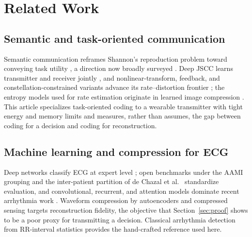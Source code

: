 \documentclass[journal]{IEEEtran}
\begin{document}
\section{Related Work}
\subsection{Semantic and task-oriented communication}
Semantic communication reframes Shannon's reproduction problem \cite{shannon1948} toward conveying task utility \cite{strinati2021,gunduz2023}, a direction now broadly surveyed \cite{qin2022,yang2023,luo2022,getu2024}. Deep JSCC learns transmitter and receiver jointly \cite{bourtsoulatze2019,xie2021,weng2021}, and nonlinear-transform, feedback, and constellation-constrained variants advance its rate--distortion frontier \cite{dai2022,kurka2020,tung2022}; the entropy models used for rate estimation originate in learned image compression \cite{balle2017,balle2018}. This article specializes task-oriented coding to a wearable transmitter with tight energy and memory limits and measures, rather than assumes, the gap between coding for a decision and coding for reconstruction.

\subsection{Machine learning and compression for ECG}
Deep networks classify ECG at expert level \cite{hannun2019,ribeiro2020}; open benchmarks \cite{moody2001,goldberger2000,strodthoff2021,wagner2020} under the AAMI grouping \cite{aami2012} and the inter-patient partition of de Chazal et al.\ \cite{dechazal2004} standardize evaluation, and convolutional, recurrent, and attention models dominate recent arrhythmia work \cite{acharya2017,kachuee2018,mousavi2019,yildirim2018,xia2023,essa2021}. Waveform compression by autoencoders and compressed sensing \cite{yildirim2018c,mamaghanian2011} targets reconstruction fidelity, the objective that Section~\ref{sec:proof} shows to be a poor proxy for transmitting a decision. Classical arrhythmia detection from RR-interval statistics \cite{pan1985} provides the hand-crafted reference used here.
\end{document}
